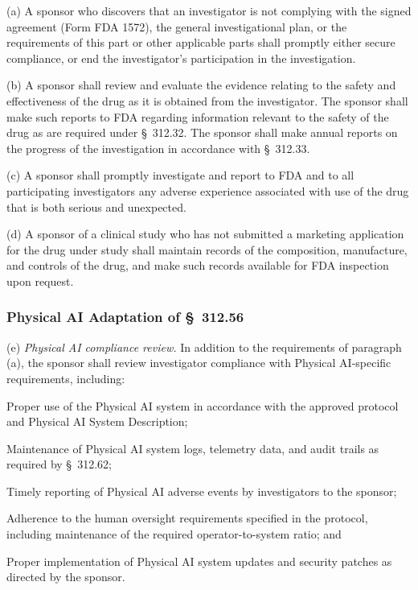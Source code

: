 \documentclass[11pt]{article}
\begin{document}
(a) A sponsor who discovers that an investigator is not complying with the signed agreement (Form FDA 1572), the general investigational plan, or the requirements of this part or other applicable parts shall promptly either secure compliance, or end the investigator's participation in the investigation.

(b) A sponsor shall review and evaluate the evidence relating to the safety and effectiveness of the drug as it is obtained from the investigator. The sponsor shall make such reports to FDA regarding information relevant to the safety of the drug as are required under \S~312.32. The sponsor shall make annual reports on the progress of the investigation in accordance with \S~312.33.

(c) A sponsor shall promptly investigate and report to FDA and to all participating investigators any adverse experience associated with use of the drug that is both serious and unexpected.

(d) A sponsor of a clinical study who has not submitted a marketing application for the drug under study shall maintain records of the composition, manufacture, and controls of the drug, and make such records available for FDA inspection upon request.

\subsubsection{Physical AI Adaptation of \S~312.56}

(e) \textit{Physical AI compliance review.} In addition to the requirements of paragraph (a), the sponsor shall review investigator compliance with Physical AI-specific requirements, including:

\begin{description}[leftmargin=0.8cm,style=sameline]
\item[(i)] Proper use of the Physical AI system in accordance with the approved protocol and Physical AI System Description;
\item[(ii)] Maintenance of Physical AI system logs, telemetry data, and audit trails as required by \S~312.62;
\item[(iii)] Timely reporting of Physical AI adverse events by investigators to the sponsor;
\item[(iv)] Adherence to the human oversight requirements specified in the protocol, including maintenance of the required operator-to-system ratio; and
\item[(v)] Proper implementation of Physical AI system updates and security patches as directed by the sponsor.
\end{description}
\end{document}
